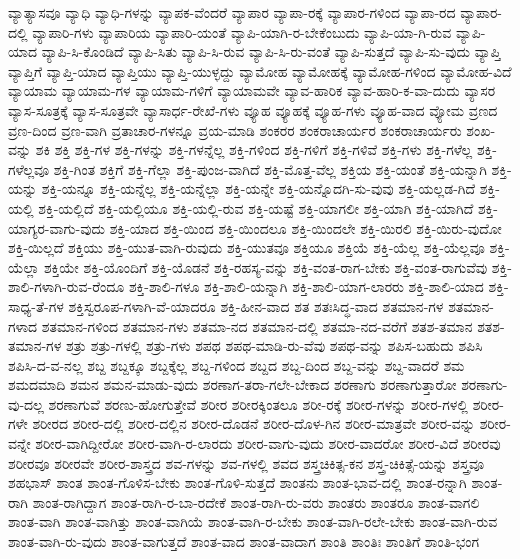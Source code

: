 {ವ್ಯಾತ್ಯಾಸವೂ
ವ್ಯಾಧಿ
ವ್ಯಾಧಿ-ಗಳನ್ನು
ವ್ಯಾಪಕ-ವೆಂದರೆ
ವ್ಯಾಪಾರ
ವ್ಯಾಪಾ-ರಕ್ಕೆ
ವ್ಯಾಪಾರ-ಗಳಿಂದ
ವ್ಯಾಪಾ-ರದ
ವ್ಯಾಪಾರ-ದಲ್ಲಿ
ವ್ಯಾಪಾರಿ-ಗಳು
ವ್ಯಾಪಾರಿಯ
ವ್ಯಾಪಾರಿ-ಯಂತೆ
ವ್ಯಾಪಿ-ಯಾಗಿ-ರ-ಬೇಕೆಂಬುದು
ವ್ಯಾಪಿ-ಯಾ-ಗಿ-ರುವ
ವ್ಯಾಪಿ-ಯಾದ
ವ್ಯಾಪಿ-ಸಿ-ಕೊಂಡಿದೆ
ವ್ಯಾಪಿ-ಸಿತು
ವ್ಯಾಪಿ-ಸಿ-ರುವ
ವ್ಯಾಪಿ-ಸಿ-ರು-ವಂತೆ
ವ್ಯಾಪಿ-ಸುತ್ತದೆ
ವ್ಯಾಪಿ-ಸು-ವುದು
ವ್ಯಾಪ್ತಿ
ವ್ಯಾಪ್ತಿಗೆ
ವ್ಯಾಪ್ತಿ-ಯಾದ
ವ್ಯಾಪ್ತಿಯು
ವ್ಯಾಪ್ತಿ-ಯುಳ್ಳದ್ದು
ವ್ಯಾಮೋಹ
ವ್ಯಾಮೋಹಕ್ಕೆ
ವ್ಯಾಮೋಹ-ಗಳಿಂದ
ವ್ಯಾಮೋಹ-ವಿದೆ
ವ್ಯಾಯಾಮ
ವ್ಯಾಯಾಮ-ಗಳ
ವ್ಯಾಯಾಮ-ಗಳಿಗೆ
ವ್ಯಾಯಾಮವೇ
ವ್ಯಾವ-ಹಾರಿಕ
ವ್ಯಾವ-ಹಾರಿ-ಕ-ವಾ-ದುದು
ವ್ಯಾಸರ
ವ್ಯಾಸ-ಸೂತ್ರಕ್ಕೆ
ವ್ಯಾಸ-ಸೂತ್ರವೇ
ವ್ಯಾಸಾರ್ಧ-ರೇಖೆ-ಗಳು
ವ್ಯೂಹ
ವ್ಯೂಹಕ್ಕೆ
ವ್ಯೂಹ-ಗಳು
ವ್ಯೂಹ-ವಾದ
ವ್ಯೋಮ
ವ್ರಣದ
ವ್ರಣ-ದಿಂದ
ವ್ರಣ-ವಾಗಿ
ವ್ರತಾಚಾರ-ಗಳನ್ನೂ
ವ್ರಯ-ಮಾಡಿ
ಶಂಕರರ
ಶಂಕರಾಚಾರ್ಯರ
ಶಂಕರಾಚಾರ್ಯರು
ಶಂಖ-ವನ್ನು
ಶಕಿ
ಶಕ್ತಿ
ಶಕ್ತಿ-ಗಳ
ಶಕ್ತಿ-ಗಳನ್ನು
ಶಕ್ತಿ-ಗಳನ್ನೆಲ್ಲ
ಶಕ್ತಿ-ಗಳಿಂದ
ಶಕ್ತಿ-ಗಳಿಗೆ
ಶಕ್ತಿ-ಗಳಿವೆ
ಶಕ್ತಿ-ಗಳು
ಶಕ್ತಿ-ಗಳೆಲ್ಲ
ಶಕ್ತಿ-ಗಳೆಲ್ಲವೂ
ಶಕ್ತಿ-ಗಿಂತ
ಶಕ್ತಿಗೆ
ಶಕ್ತಿ-ಗೆಲ್ಲಾ
ಶಕ್ತಿ-ಪುಂಜ-ವಾಗಿದೆ
ಶಕ್ತಿ-ಮೊತ್ತ-ವೆಲ್ಲ
ಶಕ್ತಿಯ
ಶಕ್ತಿ-ಯಂತೆ
ಶಕ್ತಿ-ಯನ್ನಾಗಿ
ಶಕ್ತಿ-ಯನ್ನು
ಶಕ್ತಿ-ಯನ್ನೂ
ಶಕ್ತಿ-ಯನ್ನೆಲ್ಲ
ಶಕ್ತಿ-ಯನ್ನೆಲ್ಲಾ
ಶಕ್ತಿ-ಯನ್ನೇ
ಶಕ್ತಿ-ಯನ್ನೊದಗಿ-ಸು-ವುವು
ಶಕ್ತಿ-ಯಲ್ಲಡ-ಗಿದೆ
ಶಕ್ತಿ-ಯಲ್ಲಿ
ಶಕ್ತಿ-ಯಲ್ಲಿದೆ
ಶಕ್ತಿ-ಯಲ್ಲಿಯೂ
ಶಕ್ತಿ-ಯಲ್ಲಿ-ರುವ
ಶಕ್ತಿ-ಯಷ್ಟೆ
ಶಕ್ತಿ-ಯಾಗಲೀ
ಶಕ್ತಿ-ಯಾಗಿ
ಶಕ್ತಿ-ಯಾಗಿದೆ
ಶಕ್ತಿ-ಯಾಗ್ಯರ-ವಾಗು-ವುದು
ಶಕ್ತಿ-ಯಾದ
ಶಕ್ತಿ-ಯಿಂದ
ಶಕ್ತಿ-ಯಿಂದಲೂ
ಶಕ್ತಿ-ಯಿಂದಲೇ
ಶಕ್ತಿ-ಯಿರಲಿ
ಶಕ್ತಿ-ಯಿರು-ವುದೋ
ಶಕ್ತಿ-ಯಿಲ್ಲದೆ
ಶಕ್ತಿಯು
ಶಕ್ತಿ-ಯುತ-ವಾಗಿ-ರುವುದು
ಶಕ್ತಿ-ಯುತವೂ
ಶಕ್ತಿಯೂ
ಶಕ್ತಿಯೆ
ಶಕ್ತಿ-ಯೆಲ್ಲ
ಶಕ್ತಿ-ಯೆಲ್ಲವೂ
ಶಕ್ತಿ-ಯೆಲ್ಲಾ
ಶಕ್ತಿಯೇ
ಶಕ್ತಿ-ಯೊಂದಿಗೆ
ಶಕ್ತಿ-ಯೊಡನೆ
ಶಕ್ತಿ-ರಹಸ್ಯ-ವನ್ನು
ಶಕ್ತಿ-ವಂತ-ರಾಗ-ಬೇಕು
ಶಕ್ತಿ-ವಂತ-ರಾಗುವೆವು
ಶಕ್ತಿ-ಶಾಲಿ-ಗಳಾಗಿ-ರುವ-ರೆಂದೂ
ಶಕ್ತಿ-ಶಾಲಿ-ಗಳೂ
ಶಕ್ತಿ-ಶಾಲಿ-ಯನ್ನಾಗಿ
ಶಕ್ತಿ-ಶಾಲಿ-ಯಾಗ-ಲಾರರು
ಶಕ್ತಿ-ಶಾಲಿ-ಯಾದ
ಶಕ್ತಿ-ಸಾಧ್ಯ-ತೆ-ಗಳ
ಶಕ್ತಿಸ್ವರೂಪ-ಗಳಾಗಿ-ವೆ-ಯಾದರೂ
ಶಕ್ತಿ-ಹೀನ-ವಾದ
ಶತ
ಶತಃಸಿದ್ಧ-ವಾದ
ಶತಮಾನ-ಗಳ
ಶತಮಾನ-ಗಳಾದ
ಶತಮಾನ-ಗಳಿಂದ
ಶತಮಾನ-ಗಳು
ಶತಮಾ-ನದ
ಶತಮಾನ-ದಲ್ಲಿ
ಶತಮಾ-ನದ-ವರೆಗೆ
ಶತಶ-ತಮಾನ
ಶತಶ-ತಮಾನ-ಗಳ
ಶತ್ರು
ಶತ್ರು-ಗಳಲ್ಲಿ
ಶತ್ರು-ಗಳು
ಶಪಥ
ಶಪಥ-ಮಾಡಿ-ರು-ವೆವು
ಶಪಥ-ವನ್ನು
ಶಪಿಸ-ಬಹುದು
ಶಪಿಸಿ
ಶಪಿಸಿ-ದ-ವ-ನಲ್ಲ
ಶಬ್ದ
ಶಬ್ದಕ್ಕೂ
ಶಬ್ದಕ್ಕೆಲ್ಲ
ಶಬ್ದ-ಗಳಿಂದ
ಶಬ್ದದ
ಶಬ್ದ-ದಿಂದ
ಶಬ್ದ-ವನ್ನು
ಶಬ್ದ-ವಾದರೆ
ಶಮ
ಶಮದಮಾದಿ
ಶಮನ
ಶಮನ-ಮಾಡು-ವುದು
ಶರಣಾಗ-ತರಾ-ಗಲೇ-ಬೇಕಾದ
ಶರಣಾಗು
ಶರಣಾಗುತ್ತಾರೋ
ಶರಣಾಗು-ವು-ದಲ್ಲ
ಶರಣಾಗುವೆ
ಶರಣು-ಹೋಗುತ್ತೇವೆ
ಶರೀರ
ಶರೀರಕ್ಕಿಂತಲೂ
ಶರೀ-ರಕ್ಕೆ
ಶರೀರ-ಗಳನ್ನು
ಶರೀರ-ಗಳಲ್ಲಿ
ಶರೀರ-ಗಳೇ
ಶರೀರದ
ಶರೀರ-ದಲ್ಲಿ
ಶರೀರ-ದಲ್ಲಿನ
ಶರೀರ-ದೊಡನೆ
ಶರೀರ-ದೊಳ-ಗಿನ
ಶರೀರ-ಮಾತ್ರವೇ
ಶರೀರ-ವನ್ನು
ಶರೀರ-ವನ್ನೇ
ಶರೀರ-ವಾಗಿದ್ದೀರೋ
ಶರೀರ-ವಾಗಿ-ರ-ಲಾರದು
ಶರೀರ-ವಾಗು-ವುದು
ಶರೀರ-ವಾದರೋ
ಶರೀರ-ವಿದೆ
ಶರೀರವು
ಶರೀರವೂ
ಶರೀರವೇ
ಶರೀರ-ಶಾಸ್ತ್ರದ
ಶವ-ಗಳನ್ನು
ಶವ-ಗಳಲ್ಲಿ
ಶವದ
ಶಸ್ತ್ರಚಿಕಿತ್ಸ-ಕನ
ಶಸ್ತ್ರ-ಚಿಕಿತ್ಸೆ-ಯನ್ನು
ಶಸ್ತ್ರವೂ
ಶಹಭಾಸ್
ಶಾಂತ
ಶಾಂತ-ಗೊಳಿಸ-ಬೇಕು
ಶಾಂತ-ಗೊಳಿ-ಸುತ್ತದೆ
ಶಾಂತನು
ಶಾಂತ-ಭಾವ-ದಲ್ಲಿ
ಶಾಂತ-ರನ್ನಾಗಿ
ಶಾಂತ-ರಾಗಿ
ಶಾಂತ-ರಾಗಿದ್ದಾಗ
ಶಾಂತ-ರಾಗಿ-ರ-ಬಾ-ರದೇಕೆ
ಶಾಂತ-ರಾಗಿ-ರು-ವರು
ಶಾಂತರು
ಶಾಂತರೂ
ಶಾಂತ-ವಾಗಲಿ
ಶಾಂತ-ವಾಗಿ
ಶಾಂತ-ವಾಗಿತ್ತು
ಶಾಂತ-ವಾಗಿಯೆ
ಶಾಂತ-ವಾಗಿ-ರ-ಬೇಕು
ಶಾಂತ-ವಾಗಿ-ರಲೇ-ಬೇಕು
ಶಾಂತ-ವಾಗಿ-ರುವ
ಶಾಂತ-ವಾಗಿ-ರು-ವುದು
ಶಾಂತ-ವಾಗುತ್ತದೆ
ಶಾಂತ-ವಾದ
ಶಾಂತ-ವಾದಾಗ
ಶಾಂತಿ
ಶಾಂತಿಃ
ಶಾಂತಿಗೆ
ಶಾಂತಿ-ಭಂಗ
}
